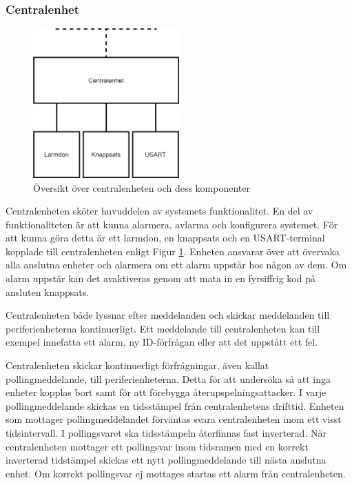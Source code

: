 \documentclass[a4paper]{article}
\begin{document}
\subsubsection{Centralenhet}
\begin{figure}[H]
    \centering
    \includegraphics[width=0.5\textwidth]{central-oversikt-pp.png}
    \caption{Översikt över centralenheten och dess komponenter}
    \label{fig:oversiktcentral}
\end{figure}

Centralenheten sköter huvuddelen av systemets funktionalitet.
En del av funktionaliteten är att kunna alarmera, avlarma och konfigurera systemet.
För att kunna göra detta är ett larmdon, en knappsats och en USART-terminal kopplade till centralenheten enligt Figur \ref{fig:oversiktcentral}.
Enheten ansvarar över att övervaka alla anslutna enheter och alarmera om ett alarm uppstår hos någon av dem.
Om alarm uppstår kan det avaktiveras genom att mata in en fyrsiffrig kod på ansluten knappsats.

Centralenheten både lyssnar efter meddelanden och skickar meddelanden till periferienheterna kontinuerligt.
Ett meddelande till centralenheten kan till exempel innefatta ett alarm, ny ID-förfrågan eller att det uppstått ett fel.

Centralenheten skickar kontinuerligt förfrågningar, även kallat pollingmeddelande, till periferienheterna.
Detta för att undersöka så att inga enheter kopplas bort samt för att förebygga återupspelningsattacker.
I varje pollingmeddelande skickas en tidsstämpel från centralenhetens drifttid.
Enheten som mottager pollingmeddelandet förväntas svara centralenheten inom ett visst tidsintervall.
I pollingsvaret ska tidsstämpeln återfinnas fast inverterad.
När centralenheten mottager ett pollingsvar inom tidsramen med en korrekt inverterad tidstämpel skickas ett nytt pollingmeddelande till nästa anslutna enhet.
Om korrekt pollingsvar ej mottages startas ett alarm från centralenheten.
\end{document}
